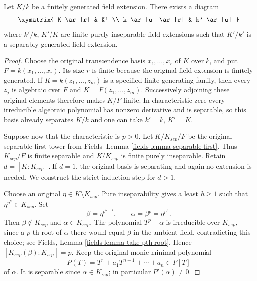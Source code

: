 \begin{lemma}
\label{editorial-source-lemma-make-separably-generated}
Let $K/k$ be a finitely generated field extension.
There exists a diagram
$$
\xymatrix{
K \ar[r] & K' \\
k \ar[u] \ar[r] & k' \ar[u]
}
$$
where $k'/k$, $K'/K$ are finite purely inseparable field
extensions such that $K'/k'$ is a separably generated field extension.
\end{lemma}

\begin{proof}
Choose the original transcendence basis
$x_1,\ldots,x_r$ of $K$ over $k$, and put
$F=k(x_1,\ldots,x_r)$. Its size $r$ is finite
because the original field extension is finitely
generated. If $K=k(z_1,\ldots,z_m)$ is a specified
finite generating family, then every $z_j$ is
algebraic over $F$ and $K=F(z_1,\ldots,z_m)$.
Successively adjoining these original elements
therefore makes $K/F$ finite. In characteristic
zero every irreducible algebraic polynomial has
nonzero derivative and is separable, so this
basis already separates $K/k$ and one can take
$k'=k$, $K'=K$.

Suppose now that the characteristic is $p>0$.
Let $K/K_{sep}/F$ be the original separable-first
tower from Fields, Lemma \ref{fields-lemma-separable-first}.
Thus $K_{sep}/F$ is finite separable and
$K/K_{sep}$ is finite purely inseparable. Retain
$d=[K:K_{sep}]$. If $d=1$, the original basis
is separating and again no extension is needed.
We construct the strict induction step for $d>1$.

Choose an original $\eta\in K\setminus K_{sep}$.
Pure inseparability gives a least $h\geq1$
such that $\eta^{p^h}\in K_{sep}$. Set
$$
\beta=\eta^{p^{h-1}},\qquad
\alpha=\beta^p=\eta^{p^h}.
$$
Then $\beta\notin K_{sep}$ and
$\alpha\in K_{sep}$. The polynomial $T^p-\alpha$
is irreducible over $K_{sep}$, since a $p$-th
root of $\alpha$ there would equal $\beta$
in the ambient field, contradicting this choice;
see Fields, Lemma \ref{fields-lemma-take-pth-root}.
Hence $[K_{sep}(\beta):K_{sep}]=p$.
Keep the original monic minimal polynomial
$$
P(T)=T^n+a_1T^{n-1}+\cdots+a_n\in F[T]
$$
of $\alpha$. It is separable since
$\alpha\in K_{sep}$; in particular $P'(\alpha)\ne0$.


\end{proof}
